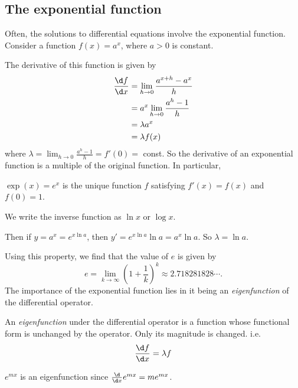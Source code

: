 \documentclass[a4paper]{article}
\begin{document}
\subsection{The exponential function}
Often, the solutions to differential equations involve the exponential function. Consider a function $f(x) = a^x$, where $a>0$ is constant.
\begin{center}
\end{center}
The derivative of this function is given by
\begin{align*}
  \frac{\d f}{\d x} &= \lim_{h\to 0}\frac{a^{x+h}-a^x}{h}\\
  &= a^x\lim_{h\to 0}\frac{a^h-1}{h}\\
  &= \lambda a^x\\
  &= \lambda f(x)
\end{align*}
where $\displaystyle \lambda = \lim_{h\to 0}\frac{a^h-1}{h} = f'(0) = $ const. So the derivative of an exponential function is a multiple of the original function. In particular,

\begin{defi}
  $\exp(x) = e^x$ is the unique function $f$ satisfying $f'(x) = f(x)$ and $f(0) = 1$.

  We write the inverse function as $\ln x$ or $\log x$.
\end{defi}
Then if $y = a^x = e^{x\ln a}$, then $y' = e^{x\ln a}\ln a = a^x\ln a$. So $\lambda = \ln a$.

Using this property, we find that the value of $e$ is given by
\[
  e=\lim_{k\to \infty} \left(1 + \frac{1}{k}\right)^k \approx 2.718281828\cdots.
\]
The importance of the exponential function lies in it being an \emph{eigenfunction} of the differential operator.
\begin{defi}[Eigenfunction]
  An \emph{eigenfunction} under the differential operator is a function whose functional form is unchanged by the operator. Only its magnitude is changed. i.e.
  \[
    \frac{\d f}{\d x} = \lambda f
  \]
\end{defi}
\begin{eg}
  $e^{mx}$ is an eigenfunction since $\frac{\d }{\d x}e^{mx} = me^{mx}$.
\end{eg}
\end{document}
